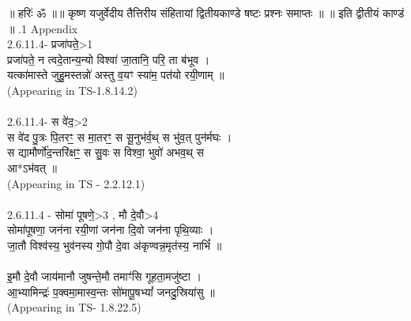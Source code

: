 \documentclass[17pt]{extarticle}
\begin{document}
        
        ॥ हरिः॑ ॐ ॥॥ कृष्ण यजुर्वेदीय तैत्तिरीय संहितायां द्वितीयकाण्डे षष्टः प्रश्नः समाप्तः ॥
॥ इति द्वीतीयं काण्डं ॥ \newline
        .1   Appendix\\2.6.11.4- प्रजा॑पते॒>1\\प्रजा॑पते॒ न त्वदे॒तान्य॒न्यो विश्वा॑ जा॒तानि॒ परि॒ ता ब॑भूव । \\यत्का॑मास्ते जुहु॒मस्तन्नो॑ अस्तु व॒यꣳ स्या॑म॒ पत॑यो रयी॒णाम् ॥\\(Appearing in TS-1.8.14.2)\\\\2.6.11.4- स वे॑द॒>2\\स वे॑द पु॒त्रः पि॒तरꣳ॒॒ स मा॒तरꣳ॒॒ स सू॒नुभ॑र्व॒थ् स भु॑व॒त् पुन॑र्मघः । \\स द्यामौर्णो॑द॒न्तरि॑क्षꣳ॒॒ स सु॒वः स विश्वा॒ भुवो॑ अभव॒थ् स \\आ*ऽभ॑वत् ॥\\(Appearing in TS - 2.2.12.1)\\\\2.6.11.4 - सोमा॑ पूषणे॒>3 , मौ दे॒वौ>4\\सोमा॑पूषणा॒ जन॑ना रयी॒णां जन॑ना दि॒वो जन॑ना पृथि॒व्याः ।\\जा॒तौ विश्व॑स्य॒ भुव॑नस्य गो॒पौ दे॒वा अ॑कृण्वन्न॒मृत॑स्य॒ नाभिं᳚ ॥\\\\इ॒मौ दे॒वौ जाय॑मानौ जुषन्ते॒मौ तमाꣳ॑सि गूहता॒मजु॑ष्टा । \\आ॒भ्यामिन्द्रः॑ प॒क्वमा॒मास्व॒न्तः सो॑मापू॒षभ्यां᳚ जनदु॒स्रिया॑सु ॥ \\(Appearing in TS- 1.8.22.5)\\\\\\\\
                \pagebreak
        
\end{document}
